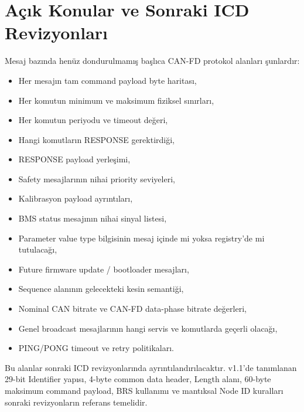 \documentclass[a4paper,10pt]{article}
\begin{document}
\section{Açık Konular ve Sonraki ICD Revizyonları}

Mesaj bazında henüz dondurulmamış başlıca CAN-FD protokol alanları şunlardır:

\begin{itemize}
    \item Her mesajın tam command payload byte haritası,
    \item Her komutun minimum ve maksimum fiziksel sınırları,
    \item Her komutun periyodu ve timeout değeri,
    \item Hangi komutların RESPONSE gerektirdiği,
    \item RESPONSE payload yerleşimi,
    \item Safety mesajlarının nihai priority seviyeleri,
    \item Kalibrasyon payload ayrıntıları,
    \item BMS status mesajının nihai sinyal listesi,
    \item Parameter value type bilgisinin mesaj içinde mi yoksa registry'de mi tutulacağı,
    \item Future firmware update / bootloader mesajları,
    \item Sequence alanının gelecekteki kesin semantiği,
    \item Nominal CAN bitrate ve CAN-FD data-phase bitrate değerleri,
    \item Genel broadcast mesajlarının hangi servis ve komutlarda geçerli olacağı,
    \item PING/PONG timeout ve retry politikaları.
\end{itemize}

Bu alanlar sonraki ICD revizyonlarında ayrıntılandırılacaktır. v1.1'de tanımlanan 29-bit
Identifier yapısı, 4-byte common data header, Length alanı, 60-byte maksimum command payload,
BRS kullanımı ve mantıksal Node ID kuralları sonraki revizyonların referans temelidir.
\end{document}
